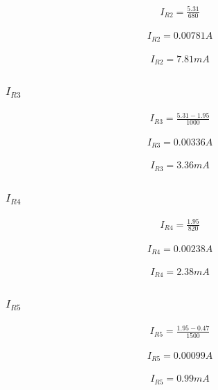 \documentclass[conference]{IEEEtran}
\begin{document}
\begin{align*}
I_{R2}=\frac{5.31}{680}
\end{align*}

\begin{align*}
I_{R2}=0.00781A
\end{align*}

\begin{align*}
I_{R2}=7.81mA
\end{align*}

\subsubsection{$I_{R3}$}

\begin{align*}
I_{R3}=\frac{5.31-1.95}{1000}
\end{align*}

\begin{align*}
I_{R3}=0.00336A
\end{align*}

\begin{align*}
I_{R3}=3.36mA
\end{align*}

\subsubsection{$I_{R4}$}

\begin{align*}
I_{R4}=\frac{1.95}{820}
\end{align*}

\begin{align*}
I_{R4}=0.00238A
\end{align*}

\begin{align*}
I_{R4}=2.38mA
\end{align*}

\subsubsection{$I_{R5}$}

\begin{align*}
I_{R5}=\frac{1.95-0.47}{1500}
\end{align*}

\begin{align*}
I_{R5}=0.00099A
\end{align*}

\begin{align*}
I_{R5}=0.99mA
\end{align*}
\end{document}

